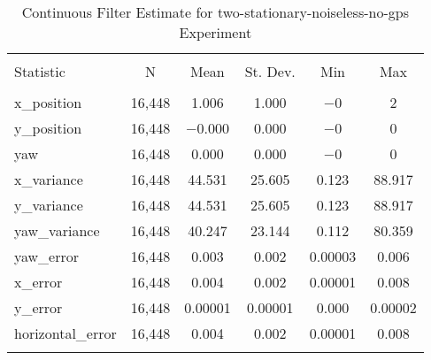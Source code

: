 
\begin{table}[h] \centering 
  \caption{Continuous Filter Estimate for two-stationary-noiseless-no-gps Experiment} 
  \label{tab:two_stationary_noiseless_no_gps_continuous_summary} 
\begin{tabular}{@{\extracolsep{5pt}}lccccc} 
\\[-1.8ex]\hline 
\hline \\[-1.8ex] 
Statistic & \multicolumn{1}{c}{N} & \multicolumn{1}{c}{Mean} & \multicolumn{1}{c}{St. Dev.} & \multicolumn{1}{c}{Min} & \multicolumn{1}{c}{Max} \\ 
\hline \\[-1.8ex] 
x\_position & 16,448 & \num{1.006} & \num{1.000} & $-$0 & 2 \\ 
y\_position & 16,448 & $-$0.000 & \num{0.000} & $-$0 & 0 \\ 
yaw & 16,448 & \num{0.000} & \num{0.000} & $-$0 & 0 \\ 
x\_variance & 16,448 & \num{44.531} & \num{25.605} & \num{0.123} & \num{88.917} \\ 
y\_variance & 16,448 & \num{44.531} & \num{25.605} & \num{0.123} & \num{88.917} \\ 
yaw\_variance & 16,448 & \num{40.247} & \num{23.144} & \num{0.112} & \num{80.359} \\ 
yaw\_error & 16,448 & \num{0.003} & \num{0.002} & \num{0.00003} & \num{0.006} \\ 
x\_error & 16,448 & \num{0.004} & \num{0.002} & \num{0.00001} & \num{0.008} \\ 
y\_error & 16,448 & \num{0.00001} & \num{0.00001} & \num{0.000} & \num{0.00002} \\ 
horizontal\_error & 16,448 & \num{0.004} & \num{0.002} & \num{0.00001} & \num{0.008} \\ 
\hline \\[-1.8ex] 
\end{tabular} 
\end{table} 
